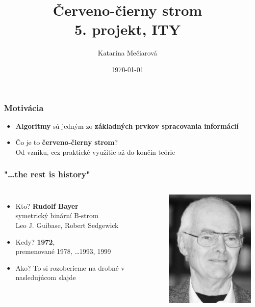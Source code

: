 \documentclass{beamer}
\date{\today}
\title{Červeno-čierny strom \\ 5. projekt, ITY}
\author{Katarína Mečiarová}
\begin{document}
    \frame[plain]{\titlepage}

    \begin{frame}
        \frametitle{Motivácia}
        \begin{itemize}
            \item \textbf{Algoritmy} sú jedným zo \textbf{základných prvkov spracovania informácií}
            \vfill
            \item Čo je to \textbf{červeno-čierny strom}?
            \vspace{10pt}
            \\ \footnotesize{Od vzniku, cez praktické využitie až do končín teórie}
        \end{itemize}
    \end{frame}

    \begin{frame}
        \frametitle{"\ldots the rest is history"}
        \begin{columns}
            \begin{itemize}
                \item Kto? \textbf{Rudolf Bayer}
                \vspace{5pt} \\ \footnotesize{symetrický binární B-strom} \vspace{10pt} \\
                Leo J. Guibase, Robert Sedgewick
                \vspace{10pt} \\
                \item \normalsize{Kedy}? \textbf{1972}, \\ \vspace{5pt}
                {\footnotesize{premenované 1978, \ldots 1993, 1999}}  \vspace{15pt}
                \item Ako? \footnotesize{To si rozoberieme na drobné v nasledujúcom slajde}
            \end{itemize}
            \includegraphics[width=150pt]{pic/bayer}
        \end{columns}
    \end{frame}
\end{document}
